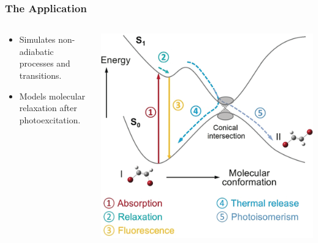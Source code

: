 \begin{frame}
    \frametitle{The Application}
    \begin{columns}[T]
        \begin{column}{0.5\textwidth}
            \vspace{2cm}
            \begin{itemize}
                \item Simulates non-adiabatic processes and transitions.
                \item Models molecular relaxation after photoexcitation.
            \end{itemize}
        \end{column}
        \begin{column}{0.5\textwidth}
            \includegraphics[width=\textwidth]{images/ehrenfest2.png}
        \end{column}
    \end{columns}
\end{frame}

